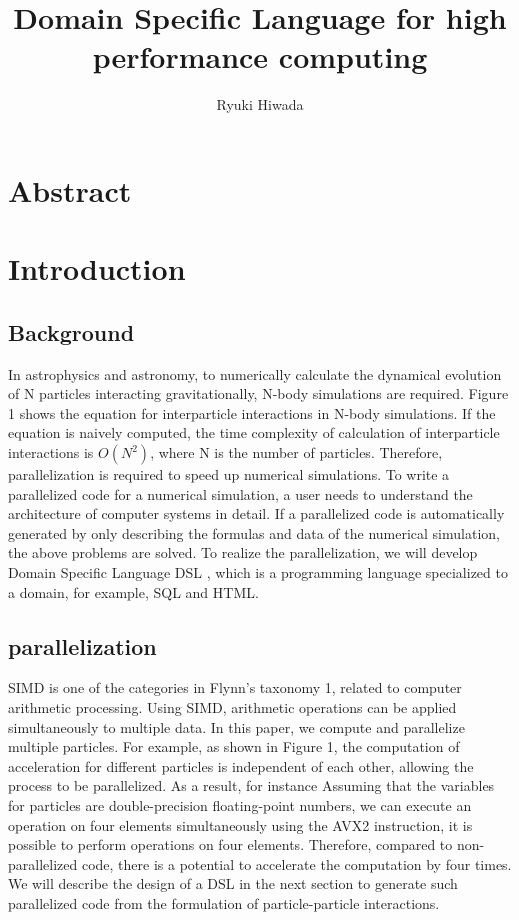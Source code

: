 \documentclass[ams]{U-AizuGT}
\author{Ryuki Hiwada}
\title{Domain Specific Language for high performance computing}
\begin{document}
\maketitle
\section{Abstract}
\section{Introduction}
\subsection{Background}
In astrophysics and astronomy, to numerically calculate the dynamical 
evolution of N particles interacting gravitationally, N-body simulations 
are required. Figure 1 shows the equation for interparticle interactions 
in N-body simulations. If the equation is naively computed, the time
complexity of calculation of interparticle interactions is 
\begin{math}O(N^2) \end{math}, where 
N is the number of particles. Therefore, parallelization is required to
speed up numerical simulations. To write a parallelized code for a 
numerical simulation, a user needs to understand the architecture of 
computer systems in  detail. If a parallelized code is automatically
generated by only describing the formulas and data of the numerical
simulation, the above problems are solved. To realize the parallelization,
we will develop Domain Specific Language \lparen DSL \rparen, which is a 
programming language specialized to a domain, for example, SQL and HTML.
\subsection{parallelization}
SIMD is one of the categories in Flynn's taxonomy 1, related to computer arithmetic
 processing. Using SIMD, arithmetic operations can be applied simultaneously to
multiple data. In this paper, we compute and parallelize multiple particles. For example, 
as shown in Figure 1, the computation of acceleration for different particles is independent
of each other, allowing the process to be parallelized. As a result, for instance Assuming 
that the variables for particles are double-precision floating-point numbers, we can execute 
an operation on four elements simultaneously using the AVX2 instruction, it is possible to 
perform operations on four elements. Therefore, compared to non-parallelized code, there is
a potential to accelerate the computation by four times. We will describe the design of a 
DSL in the next section to generate such parallelized code from the formulation of particle-particle interactions.
\end{document}
